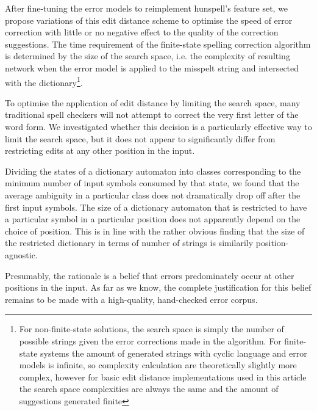 \documentclass[11pt]{article}
\begin{document}
After fine-tuning the error models to reimplement hunspell's feature set, we
propose variations of this edit distance scheme to optimise the
speed of error correction with little or no negative effect to the quality of
the correction suggestions. The time requirement of the
finite-state spelling correction algorithm is determined by the size of the
search space,
i.e. the complexity of resulting network when the error model is applied to the
misspelt string and intersected with the dictionary\footnote{For non-finite-state
solutions, the search space is simply the number of
possible strings given the error corrections made in the algorithm. For
finite-state systems the amount of generated strings with cyclic language and
error models is infinite, so complexity calculation are theoretically slightly
more complex, however for basic edit distance implementations used in this
article the search space complexities are always the same and the amount of
suggestions generated finite}.

To optimise the application of edit distance by limiting the search space, many
traditional spell checkers will not attempt to correct the very first letter of
the word form. We investigated whether this decision is a particularly
effective way to limit the search space, but it does not appear to
significantly differ from restricting edits at any other position in the input.

Dividing the states of a dictionary automaton into classes corresponding to
the minimum number of input symbols consumed by that state, we found that
the average ambiguity in a particular class does not dramatically drop off after
the first input symbols.
The size of a dictionary automaton that is restricted to have
a particular symbol in a particular position does not apparently depend on the
choice of position. This is in line with the rather obvious finding that the
size of the restricted dictionary in terms of number of strings is similarily
position-agnostic.

Presumably, the rationale is a belief that errors predominately occur at other
positions in the input. As far as we know, the complete justification for this
belief remains to be made with a high-quality, hand-checked error corpus.
\end{document}

